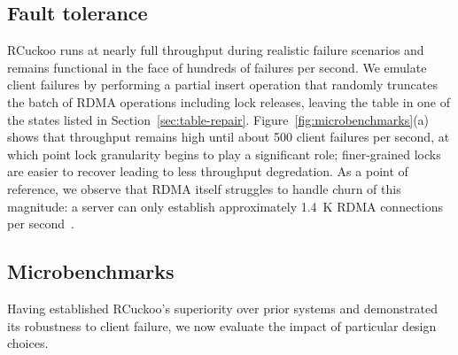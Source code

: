 
\subsection{Fault tolerance}


RCuckoo runs at nearly full throughput during realistic
failure scenarios and remains functional in the face of
hundreds of failures per second.
We emulate client failures by
performing a partial insert operation that randomly truncates the
batch of RDMA operations including lock releases, leaving the table
in one of the  states listed in
Section~\ref{sec:table-repair}.
Figure~\ref{fig:microbenchmarks}(a) shows that
throughput remains high until about 500 client failures per second, at
which point lock granularity begins to play a significant role;
finer-grained locks are easier to recover leading to less throughput
degredation.
As a point of reference, we observe that RDMA itself struggles to handle churn of this magnitude:
a server can only
establish approximately 1.4~K RDMA connections per second~\cite{xrdma}.

\subsection{Microbenchmarks}


Having established RCuckoo's superiority over prior systems and
demonstrated its robustness to client failure, we now evaluate the
impact of particular design choices.





